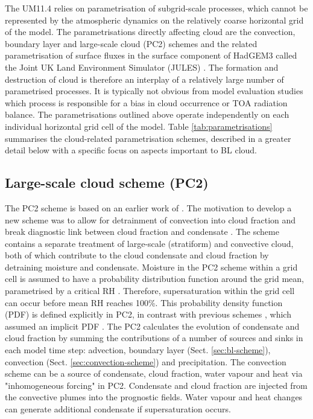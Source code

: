 The UM11.4 relies on parametrisation of subgrid-scale processes,
which cannot be represented by the atmospheric dynamics on the relatively
coarse horizontal grid of the model. The parametrisations directly affecting cloud
are the convection, boundary layer and large-scale cloud (PC2) schemes
and the related parametrisation of surface fluxes in the surface component of
HadGEM3 called the Joint UK Land Environment Simulator (JULES) \citep{best2011,clark2011}. The formation
and destruction of cloud is therefore an interplay of a relatively large number
of parametrised processes. It is typically not obvious from model
evaluation studies which process is responsible for a bias in cloud occurrence
or TOA radiation balance. The parametrisations outlined above operate independently
on each individual horizontal grid cell of the model.
Table \ref{tab:parametrisations} summarises the cloud-related
parametrisation schemes, described in a greater detail below with a specific
focus on aspects important to BL cloud.

\subsection{Large-scale cloud scheme (PC2)}

The PC2 scheme is based on an earlier work of \cite{tiedtke1993}. The motivation to
develop a new scheme was to allow for detrainment of convection into cloud
fraction and break diagnostic link between cloud fraction and condensate
\citep{umdp030}. The scheme contains a separate treatment of large-scale (stratiform) and
convective cloud, both of which contribute to the cloud condensate and cloud
fraction by detraining moisture and condensate. Moisture in the PC2 scheme
within a grid cell is assumed to have a probability distribution function around
the grid mean, parametrised by a critical RH \citep{gregory2002}.
Therefore, supersaturation within the grid cell can occur before mean
RH reaches 100\%. This probability density function (PDF) is defined explicitly in PC2, in
contrast with previous schemes \citep{tiedtke1993}, which assumed an implicit
PDF \citep{wilson2008a}.
The PC2 calculates the evolution of condensate and cloud fraction by summing the
contributions of a number of sources and sinks in each model time step:
advection,  boundary layer (Sect. \ref{sec:bl-scheme}),
convection (Sect. \ref{sec:convection-scheme}) and precipitation.
The convection scheme can be a
source of condensate, cloud fraction, water vapour and heat via "inhomogeneous
forcing" in PC2. Condensate and cloud fraction are injected from the convective
plumes into the prognostic fields. Water vapour and heat changes can generate additional
condensate if supersaturation occurs.


